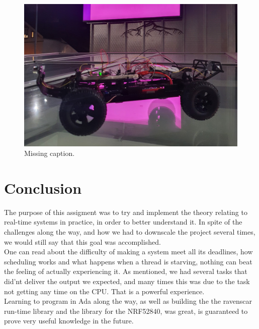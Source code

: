\documentclass{article}
\begin{document}
\begin{figure}[H]
	\centering
	\includegraphics[width=\linewidth]{showcase.png}
	\caption{Missing caption.}
	\label{showcase}
\end{figure}

\section{Conclusion}

The purpose of this assigment was to try and implement the theory relating to real-time systems in practice, in order to better understand it. In spite of the challenges along the way, and how we had to downscale the project several times, we would still say that this goal was accomplished.\\

One can read about the difficulty of making a system meet all its deadlines, how scheduling works and what happens when a thread is starving, nothing can beat the feeling of actually experiencing it. As mentioned, we had several tasks that did'nt deliver the output we expected, and many times this was due to the task not getting any time on the CPU. That is a powerful experience.\\ 

Learning to program in Ada along the way, as well as building the the ravenscar run-time library and the library for the NRF52840, was great, is guaranteed to prove very useful knowledge in the future.\\ 

\newpage
\nocite{*}


\end{document}
